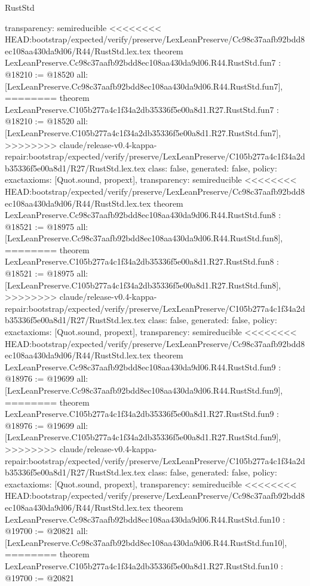 \begin{lexlean}{RustStd}
\begin{coremodule}
{\begin{coremodule}
{{{{{{{{{{  transparency: semireducible
}
<<<<<<<< HEAD:bootstrap/expected/verify/preserve/LexLeanPreserve/Cc98c37aafb92bdd8ec108aa430da9d06/R44/RustStd.lex.tex
theorem LexLeanPreserve.Cc98c37aafb92bdd8ec108aa430da9d06.R44.RustStd.fun7 : @18210 := @18520 {
  all: [LexLeanPreserve.Cc98c37aafb92bdd8ec108aa430da9d06.R44.RustStd.fun7],
========
theorem LexLeanPreserve.C105b277a4c1f34a2db35336f5e00a8d1.R27.RustStd.fun7 : @18210 := @18520 {
  all: [LexLeanPreserve.C105b277a4c1f34a2db35336f5e00a8d1.R27.RustStd.fun7],
>>>>>>>> claude/release-v0.4-kappa-repair:bootstrap/expected/verify/preserve/LexLeanPreserve/C105b277a4c1f34a2db35336f5e00a8d1/R27/RustStd.lex.tex
  class: false,
  generated: false,
  policy: exact{axioms: [Quot.sound, propext]},
  transparency: semireducible
}
<<<<<<<< HEAD:bootstrap/expected/verify/preserve/LexLeanPreserve/Cc98c37aafb92bdd8ec108aa430da9d06/R44/RustStd.lex.tex
theorem LexLeanPreserve.Cc98c37aafb92bdd8ec108aa430da9d06.R44.RustStd.fun8 : @18521 := @18975 {
  all: [LexLeanPreserve.Cc98c37aafb92bdd8ec108aa430da9d06.R44.RustStd.fun8],
========
theorem LexLeanPreserve.C105b277a4c1f34a2db35336f5e00a8d1.R27.RustStd.fun8 : @18521 := @18975 {
  all: [LexLeanPreserve.C105b277a4c1f34a2db35336f5e00a8d1.R27.RustStd.fun8],
>>>>>>>> claude/release-v0.4-kappa-repair:bootstrap/expected/verify/preserve/LexLeanPreserve/C105b277a4c1f34a2db35336f5e00a8d1/R27/RustStd.lex.tex
  class: false,
  generated: false,
  policy: exact{axioms: [Quot.sound, propext]},
  transparency: semireducible
}
<<<<<<<< HEAD:bootstrap/expected/verify/preserve/LexLeanPreserve/Cc98c37aafb92bdd8ec108aa430da9d06/R44/RustStd.lex.tex
theorem LexLeanPreserve.Cc98c37aafb92bdd8ec108aa430da9d06.R44.RustStd.fun9 : @18976 := @19699 {
  all: [LexLeanPreserve.Cc98c37aafb92bdd8ec108aa430da9d06.R44.RustStd.fun9],
========
theorem LexLeanPreserve.C105b277a4c1f34a2db35336f5e00a8d1.R27.RustStd.fun9 : @18976 := @19699 {
  all: [LexLeanPreserve.C105b277a4c1f34a2db35336f5e00a8d1.R27.RustStd.fun9],
>>>>>>>> claude/release-v0.4-kappa-repair:bootstrap/expected/verify/preserve/LexLeanPreserve/C105b277a4c1f34a2db35336f5e00a8d1/R27/RustStd.lex.tex
  class: false,
  generated: false,
  policy: exact{axioms: [Quot.sound, propext]},
  transparency: semireducible
}
<<<<<<<< HEAD:bootstrap/expected/verify/preserve/LexLeanPreserve/Cc98c37aafb92bdd8ec108aa430da9d06/R44/RustStd.lex.tex
theorem LexLeanPreserve.Cc98c37aafb92bdd8ec108aa430da9d06.R44.RustStd.fun10 : @19700 := @20821 {
  all: [LexLeanPreserve.Cc98c37aafb92bdd8ec108aa430da9d06.R44.RustStd.fun10],
========
theorem LexLeanPreserve.C105b277a4c1f34a2db35336f5e00a8d1.R27.RustStd.fun10 : @19700 := @20821 {
}}}}}}}}}}}}}}
\end{coremodule}}
\end{coremodule}
\end{lexlean}
